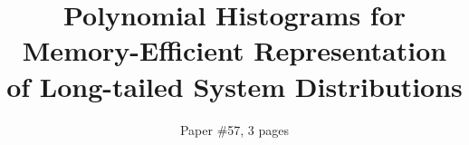 \documentclass[preprint]{sig-alternate-per}
\begin{document}


\title{Polynomial Histograms for Memory-Efficient Representation of
  Long-tailed System Distributions}

\subtitle{Paper \#57, 3 pages}

\maketitle
\end{document}
